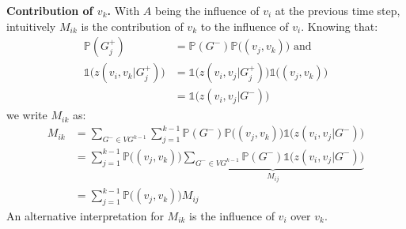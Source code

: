 

\textbf{Contribution of $v_k$.}
With $A$ being the influence of $v_i$ at the previous time step, intuitively $M_{ik}$ is the contribution of $v_k$ to the influence of $v_i$.
Knowing that:
\begin{align*}
	\mathds{P}(G_j^+) &= \mathds{P}(G^-)\mathds{P}\big((v_j,v_k)\big) \text{ and } \\
	\mathds{1}\big(z(v_i,v_k|G_j^+)\big) &= \mathds{1}\big(z(v_i,v_j|G^+_j)\big) \mathds{1}\big((v_j,v_k)\big) \\
	 &= \mathds{1}\big(z(v_i,v_j|G^-)\big)
\end{align*}
we write $M_{ik}$ as:
%
\begin{align}
	M_{ik} &= \sum_{G^- \in {VG^{k-1}}} \sum^{k-1}_{j=1} \mathds{P}(G^-)\mathds{P}\big((v_j,v_k)\big) \mathds{1}\big(z(v_i,v_j|G^-)\big) \nonumber \\
           &= \sum^{k-1}_{j=1} \mathds{P}\big((v_j,v_k)\big) \underbrace{ \sum_{G^- \in {VG^{k-1}}} \mathds{P}(G^-) \mathds{1}\big(z(v_i,v_j|G^-)\big)}_{M_{ij}} \nonumber \\  
		   &= \sum^{k-1}_{j=1} \mathds{P}\big((v_j,v_k)\big) M_{ij} \label{eq:M-ik}
\end{align}
An alternative interpretation for $M_{ik}$ is the influence of $v_i$ over $v_k$.
